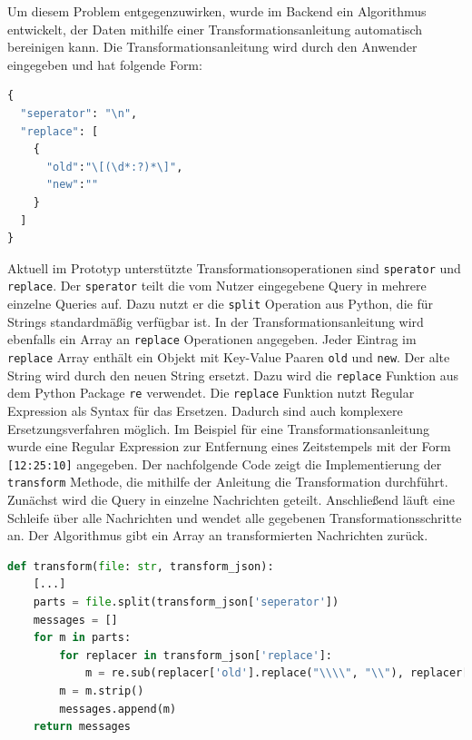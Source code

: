 Um diesem Problem entgegenzuwirken, wurde im Backend ein Algorithmus entwickelt, der Daten mithilfe einer Transformationsanleitung automatisch bereinigen kann. Die Transformationsanleitung wird durch den Anwender eingegeben und hat folgende Form:

\begin{lstlisting}[language=Python, caption={Beispiel einer Transformationsanleitung}]
{
  "seperator": "\n",
  "replace": [
    {
      "old":"\[(\d*:?)*\]",
      "new":""
    }
  ]
}
\end{lstlisting}

Aktuell im Prototyp unterstützte Transformationsoperationen sind \texttt{sperator} und \texttt{replace}. Der \texttt{sperator} teilt die vom Nutzer eingegebene Query in mehrere einzelne Queries auf. Dazu nutzt er die \texttt{split} Operation aus Python, die für Strings standardmäßig verfügbar ist. In der Transformationsanleitung wird ebenfalls ein Array an \texttt{replace} Operationen angegeben. Jeder Eintrag im \texttt{replace} Array enthält ein Objekt mit Key-Value Paaren \texttt{old} und \texttt{new}. Der alte String wird durch den neuen String ersetzt. Dazu wird die \texttt{replace} Funktion aus dem Python Package \texttt{re} verwendet. Die \texttt{replace} Funktion nutzt Regular Expression als Syntax für das Ersetzen. Dadurch sind auch komplexere Ersetzungsverfahren möglich. Im Beispiel für eine Transformationsanleitung wurde eine Regular Expression zur Entfernung eines Zeitstempels mit der Form \texttt{[12:25:10]} angegeben. Der nachfolgende Code zeigt die Implementierung der \texttt{transform} Methode, die mithilfe der Anleitung die Transformation durchführt. Zunächst wird die Query in einzelne Nachrichten geteilt. Anschließend läuft eine Schleife über alle Nachrichten und wendet alle gegebenen Transformationsschritte an. Der Algorithmus gibt ein Array an transformierten Nachrichten zurück.

\begin{lstlisting}[language=Python, caption={Transformationsalgorithmus}]
def transform(file: str, transform_json):
    [...]
    parts = file.split(transform_json['seperator'])
    messages = []
    for m in parts:
        for replacer in transform_json['replace']:
            m = re.sub(replacer['old'].replace("\\\\", "\\"), replacer['new'], m)
        m = m.strip()
        messages.append(m)
    return messages

\end{lstlisting}

